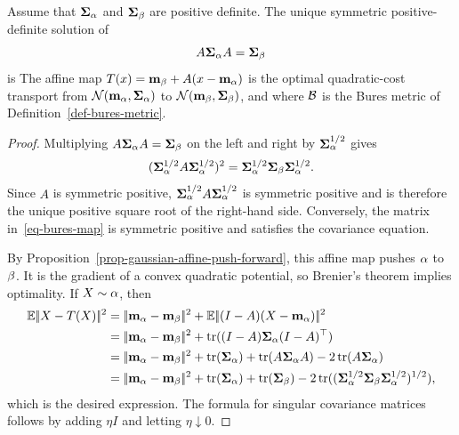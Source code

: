 \begin{prop}\label{prop-gaussian-w2-bures}
	Assume that $\mathbf{\Sigma}_\alpha$ and $\mathbf{\Sigma}_\beta$ are positive definite. The unique symmetric positive-definite solution of
	\[
		A\mathbf{\Sigma}_\alpha A=\mathbf{\Sigma}_\beta
	\]
	is
	The affine map $T(x)=\mathbf{m}_\beta+A(x-\mathbf{m}_\alpha)$ is the optimal quadratic-cost transport from $\mathcal{N}(\mathbf{m}_\alpha,\mathbf{\Sigma}_\alpha)$ to $\mathcal{N}(\mathbf{m}_\beta,\mathbf{\Sigma}_\beta)$, and
	where $\mathcal{B}$ is the Bures metric of Definition~\ref{def-bures-metric}.
\end{prop}
\begin{proof}
	Multiplying $A\mathbf{\Sigma}_\alpha A=\mathbf{\Sigma}_\beta$ on the left and right by $\mathbf{\Sigma}_\alpha^{1/2}$ gives
	\[
		(\mathbf{\Sigma}_\alpha^{1/2}A\mathbf{\Sigma}_\alpha^{1/2})^2
		=
		\mathbf{\Sigma}_\alpha^{1/2}\mathbf{\Sigma}_\beta\mathbf{\Sigma}_\alpha^{1/2}.
	\]
	Since $A$ is symmetric positive, $\mathbf{\Sigma}_\alpha^{1/2}A\mathbf{\Sigma}_\alpha^{1/2}$ is symmetric positive and is therefore the unique positive square root of the right-hand side. Conversely, the matrix in~\eqref{eq-bures-map} is symmetric positive and satisfies the covariance equation.

	By Proposition~\ref{prop-gaussian-affine-push-forward}, this affine map pushes $\alpha$ to $\beta$. It is the gradient of a convex quadratic potential, so Brenier's theorem implies optimality. If $X\sim\alpha$, then
	\begin{align*}
		\EE\norm{X-\T(X)}^2
		&=
		\norm{\mean_\al-\mean_\be}^2
		+
		\EE\norm{(I-A)(X-\mean_\al)}^2 \\
		&=
		\norm{\mean_\al-\mean_\be}^2
		+
		\tr((I-A)\cov_\al(I-A)^\top) \\
		&=
		\norm{\mean_\al-\mean_\be}^2
		+
		\tr(\cov_\al)+\tr(A\cov_\al A)-2\tr(A\cov_\al) \\
		&=
		\norm{\mean_\al-\mean_\be}^2
		+
		\tr(\cov_\al)+\tr(\cov_\be)
		-2\tr((\cov_\al^{1/2}\cov_\be\cov_\al^{1/2})^{1/2}),
	\end{align*}
	which is the desired expression. The formula for singular covariance matrices follows by adding $\eta I$ and letting $\eta\downarrow0$.
\end{proof}

